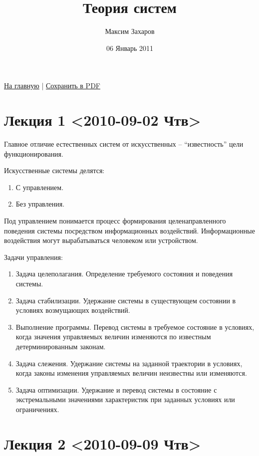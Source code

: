 \documentclass[12pt, russian, oneside, article]{ncc}
\begin{document}
\title{Теория систем}
\author{Максим Захаров}
\date{06 Январь 2011}
\maketitle

\setcounter{tocdepth}{3}
\tableofcontents
\vspace*{1cm}


\href{file:///home/maxim/Documents/Git/lectures/index.org}{На главную} | \href{file:///home/maxim/Documents/Git/lectures/other/TS_Lectures.pdf}{Сохранить в PDF}

\section{Лекция 1 <2010-09-02 Чтв>}
\label{sec-1}


Главное отличие естественных систем от искусственных -- ``известность'' цели функционирования.

Искусственные системы делятся:
\begin{enumerate}
\item С управлением.
\item Без управления.
\end{enumerate}

Под управлением понимается процесс формирования целенаправленного поведения системы посредством информационных воздействий. Информационные воздействия могут вырабатываться человеком или устройством.   
  
Задачи управления:
\begin{enumerate}
\item Задача целеполагания. Определение требуемого состояния и поведения системы.
\item Задача стабилизации. Удержание системы в существующем состоянии в условиях возмущающих воздействий.
\item Выполнение программы. Перевод системы в требуемое состояние в условиях, когда значения управляемых величин изменяются по известным детерминированным законам.
\item Задача слежения. Удержание системы на заданной траектории в условиях, когда законы изменения управляемых величин неизвестны или изменяются.
\item Задача оптимизации. Удержание и перевод системы в состояние с экстремальными значениями характеристик при заданных условиях или ограничениях.
\end{enumerate}
\section{Лекция 2 <2010-09-09 Чтв>}
\label{sec-2}
\end{document}
